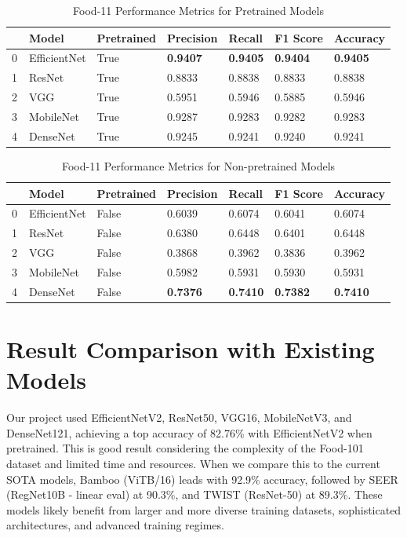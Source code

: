 \documentclass{article}
\begin{document}
\begin{table}[!ht]
    \centering
    \caption{Food-11 Performance Metrics for Pretrained Models}
    \begin{tabular}{|l|l|l|l|l|l|l|}
    \hline
        ~ & Model & Pretrained & Precision & Recall & F1 Score & Accuracy \\ \hline
        0 & EfficientNet & True & \textbf{0.9407} & \textbf{0.9405} & \textbf{0.9404} & \textbf{0.9405} \\ \hline
        1 & ResNet & True & 0.8833 & 0.8838 & 0.8833 & 0.8838 \\ \hline
        2 & VGG & True & 0.5951 & 0.5946 & 0.5885 & 0.5946 \\ \hline
        3 & MobileNet & True & 0.9287 & 0.9283 & 0.9282 & 0.9283 \\ \hline
        4 & DenseNet & True & 0.9245 & 0.9241 & 0.9240 & 0.9241 \\ \hline
    \end{tabular}
\end{table}

\begin{table}[!ht]
    \centering
    \caption{Food-11 Performance Metrics for Non-pretrained Models}
    \begin{tabular}{|l|l|l|l|l|l|l|}
    \hline
        ~ & Model & Pretrained & Precision & Recall & F1 Score & Accuracy \\ \hline
        0 & EfficientNet & False & 0.6039 & 0.6074 & 0.6041 & 0.6074 \\ \hline
        1 & ResNet & False & 0.6380 & 0.6448 & 0.6401 & 0.6448 \\ \hline
        2 & VGG & False & 0.3868 & 0.3962 & 0.3836 & 0.3962 \\ \hline
        3 & MobileNet & False & 0.5982 & 0.5931 & 0.5930 & 0.5931 \\ \hline
        4 & DenseNet & False & \textbf{0.7376} & \textbf{0.7410} & \textbf{0.7382} & \textbf{0.7410} \\ \hline
    \end{tabular}
\end{table}

\section{Result Comparison with Existing Models}

Our project used EfficientNetV2, ResNet50, VGG16, MobileNetV3, and DenseNet121, achieving a top accuracy of 82.76\% with EfficientNetV2 when pretrained. This is good result considering the complexity of the Food-101 dataset and limited time and resources. When we compare this to the current SOTA models, Bamboo (ViTB/16) leads with 92.9\% accuracy, followed by SEER (RegNet10B - linear eval) at 90.3\%, and TWIST (ResNet-50) at 89.3\%. These models likely benefit from larger and more diverse training datasets, sophisticated architectures, and advanced training regimes.
\end{document}
